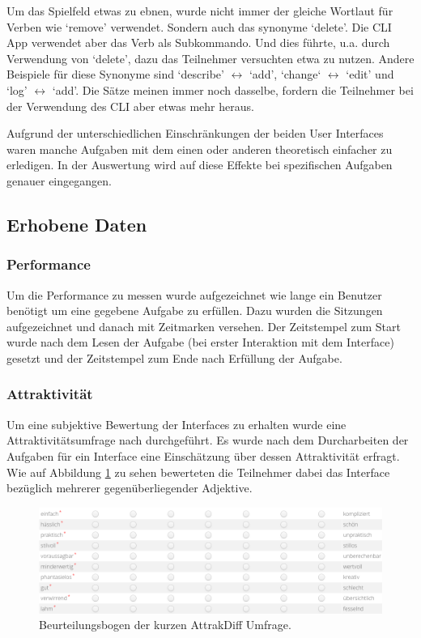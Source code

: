 \documentclass[oneside,bibliography=totocnumbered,BCOR=5mm]{scrbook}
\begin{document}
Um das Spielfeld etwas zu ebnen, wurde nicht immer der gleiche Wortlaut für
Verben wie `remove' verwendet. Sondern auch das synonyme `delete'. Die CLI
App verwendet aber das Verb  als Subkommando. Und dies
führte, u.a. durch Verwendung von `delete', dazu das Teilnehmer versuchten etwa
 zu nutzen. Andere Beispiele für diese Synonyme sind
`describe' $\leftrightarrow$ `add', `change` $\leftrightarrow$ `edit' und `log'
$\leftrightarrow$ `add'. Die Sätze meinen immer noch dasselbe, fordern die
Teilnehmer bei der Verwendung des CLI aber etwas mehr heraus.

Aufgrund der unterschiedlichen Einschränkungen der beiden User Interfaces waren
manche Aufgaben mit dem einen oder anderen theoretisch einfacher zu erledigen.
In der Auswertung wird auf diese Effekte bei spezifischen Aufgaben genauer
eingegangen.

\subsection{Erhobene Daten}

\subsubsection{Performance}

Um die Performance zu messen wurde aufgezeichnet wie lange ein Benutzer benötigt
um eine gegebene Aufgabe zu erfüllen. Dazu wurden die Sitzungen aufgezeichnet
und danach mit Zeitmarken versehen. Der Zeitstempel zum Start wurde nach dem
Lesen der Aufgabe (bei erster Interaktion mit dem Interface) gesetzt und der
Zeitstempel zum Ende nach Erfüllung der Aufgabe.

\subsubsection{Attraktivität}

Um eine subjektive Bewertung der Interfaces zu erhalten wurde eine
Attraktivitätsumfrage nach \textcite{attrakdiff} durchgeführt. Es wurde nach
dem Durcharbeiten der Aufgaben für ein Interface eine Einschätzung über
dessen Attraktivität erfragt. Wie auf Abbildung \ref{fig:survey-values}
zu sehen bewerteten die Teilnehmer dabei das Interface bezüglich mehrerer
gegenüberliegender Adjektive.

\begin{figure}[H]
  \centering
  \includegraphics[scale=0.42]{survey-values.png}
  \caption{Beurteilungsbogen der kurzen AttrakDiff Umfrage.}
  \label{fig:survey-values}
\end{figure}
\end{document}
